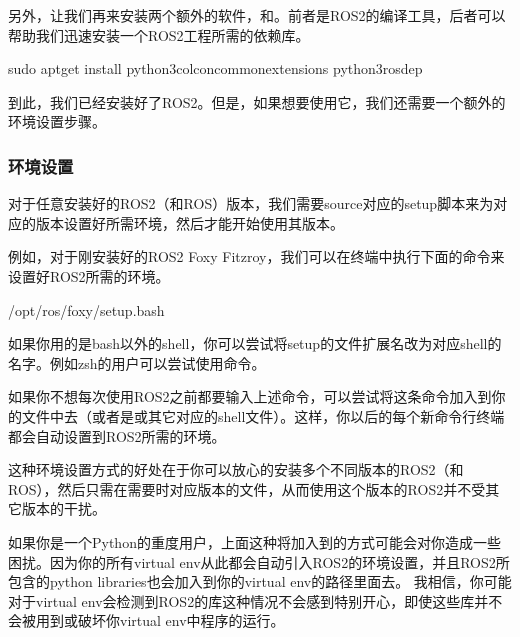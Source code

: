 \documentclass[letterpaper,10pt,english]{sphinxmanual}
\begin{document}
\sphinxAtStartPar
另外，让我们再来安装两个额外的软件，和。前者是ROS2的编译工具，后者可以帮助我们迅速安装一个ROS2工程所需的依赖库。

\begin{sphinxVerbatim}[commandchars=\\\{\}]
sudo apt\PYGZhy{}get install python3\PYGZhy{}colcon\PYGZhy{}common\PYGZhy{}extensions python3\PYGZhy{}rosdep
\end{sphinxVerbatim}

\sphinxAtStartPar
到此，我们已经安装好了ROS2。但是，如果想要使用它，我们还需要一个额外的环境设置步骤。


\subsubsection{环境设置}
\label{\detokenize{chapter_rl_sys/ros_code_ex:id2}}
\sphinxAtStartPar
对于任意安装好的ROS2（和ROS）版本，我们需要source对应的setup脚本来为对应的版本设置好所需环境，然后才能开始使用其版本。

\sphinxAtStartPar
例如，对于刚安装好的ROS2 Foxy
Fitzroy，我们可以在终端中执行下面的命令来设置好ROS2所需的环境。

\begin{sphinxVerbatim}[commandchars=\\\{\}]
 /opt/ros/foxy/setup.bash
\end{sphinxVerbatim}

\sphinxAtStartPar
如果你用的是bash以外的shell，你可以尝试将setup的文件扩展名改为对应shell的名字。例如zsh的用户可以尝试使用命令。

\sphinxAtStartPar
如果你不想每次使用ROS2之前都要输入上述命令，可以尝试将这条命令加入到你的文件中去（或者是或其它对应的shell文件）。这样，你以后的每个新命令行终端都会自动设置到ROS2所需的环境。

\sphinxAtStartPar
这种环境设置方式的好处在于你可以放心的安装多个不同版本的ROS2（和ROS），然后只需在需要时对应版本的文件，从而使用这个版本的ROS2并不受其它版本的干扰。

\sphinxAtStartPar
如果你是一个Python的重度用户，上面这种将加入到的方式可能会对你造成一些困扰。因为你的所有virtual
env从此都会自动引入ROS2的环境设置，并且ROS2所包含的python
libraries也会加入到你的virtual env的路径里面去。
我相信，你可能对于virtual
env会检测到ROS2的库这种情况不会感到特别开心，即使这些库并不会被用到或破坏你virtual
env中程序的运行。
\end{document}
